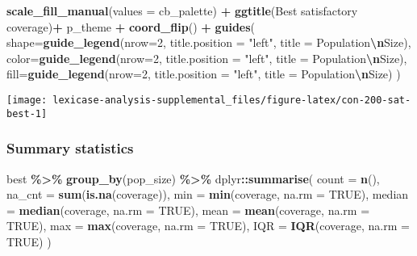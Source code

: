 \documentclass[
]{book}
\newenvironment{Shaded}{\begin{snugshade}}{\end{snugshade}}
\newcommand{\AttributeTok}[1]{\textcolor[rgb]{0.13,0.29,0.53}{#1}}
\newcommand{\ConstantTok}[1]{\textcolor[rgb]{0.56,0.35,0.01}{#1}}
\newcommand{\DecValTok}[1]{\textcolor[rgb]{0.00,0.00,0.81}{#1}}
\newcommand{\FunctionTok}[1]{\textcolor[rgb]{0.13,0.29,0.53}{\textbf{#1}}}
\newcommand{\NormalTok}[1]{#1}
\newcommand{\SpecialCharTok}[1]{\textcolor[rgb]{0.81,0.36,0.00}{\textbf{#1}}}
\newcommand{\StringTok}[1]{\textcolor[rgb]{0.31,0.60,0.02}{#1}}
\begin{document}
\begin{Shaded}
\begin{Highlighting}[]
  \FunctionTok{scale\_fill\_manual}\NormalTok{(}\AttributeTok{values =}\NormalTok{ cb\_palette) }\SpecialCharTok{+}
  \FunctionTok{ggtitle}\NormalTok{(}\StringTok{\textquotesingle{}Best satisfactory coverage\textquotesingle{}}\NormalTok{)}\SpecialCharTok{+}
\NormalTok{  p\_theme }\SpecialCharTok{+} \FunctionTok{coord\_flip}\NormalTok{() }\SpecialCharTok{+}
  \FunctionTok{guides}\NormalTok{(}
    \AttributeTok{shape=}\FunctionTok{guide\_legend}\NormalTok{(}\AttributeTok{nrow=}\DecValTok{2}\NormalTok{, }\AttributeTok{title.position =} \StringTok{"left"}\NormalTok{, }\AttributeTok{title =} \StringTok{\textquotesingle{}Population}\SpecialCharTok{\textbackslash{}n}\StringTok{Size\textquotesingle{}}\NormalTok{),}
    \AttributeTok{color=}\FunctionTok{guide\_legend}\NormalTok{(}\AttributeTok{nrow=}\DecValTok{2}\NormalTok{, }\AttributeTok{title.position =} \StringTok{"left"}\NormalTok{, }\AttributeTok{title =} \StringTok{\textquotesingle{}Population}\SpecialCharTok{\textbackslash{}n}\StringTok{Size\textquotesingle{}}\NormalTok{),}
    \AttributeTok{fill=}\FunctionTok{guide\_legend}\NormalTok{(}\AttributeTok{nrow=}\DecValTok{2}\NormalTok{, }\AttributeTok{title.position =} \StringTok{"left"}\NormalTok{, }\AttributeTok{title =} \StringTok{\textquotesingle{}Population}\SpecialCharTok{\textbackslash{}n}\StringTok{Size\textquotesingle{}}\NormalTok{)}
\NormalTok{  )}
\end{Highlighting}
\end{Shaded}

\texttt{[image: lexicase-analysis-supplemental\_files/figure-latex/con-200-sat-best-1]}

\hypertarget{summary-statistics-6}{%
\subsubsection{Summary statistics}\label{summary-statistics-6}}

\begin{Shaded}
\begin{Highlighting}[]
\NormalTok{best }\SpecialCharTok{\%\textgreater{}\%}
  \FunctionTok{group\_by}\NormalTok{(pop\_size) }\SpecialCharTok{\%\textgreater{}\%}
\NormalTok{  dplyr}\SpecialCharTok{::}\FunctionTok{summarise}\NormalTok{(}
    \AttributeTok{count =} \FunctionTok{n}\NormalTok{(),}
    \AttributeTok{na\_cnt =} \FunctionTok{sum}\NormalTok{(}\FunctionTok{is.na}\NormalTok{(coverage)),}
    \AttributeTok{min =} \FunctionTok{min}\NormalTok{(coverage, }\AttributeTok{na.rm =} \ConstantTok{TRUE}\NormalTok{),}
    \AttributeTok{median =} \FunctionTok{median}\NormalTok{(coverage, }\AttributeTok{na.rm =} \ConstantTok{TRUE}\NormalTok{),}
    \AttributeTok{mean =} \FunctionTok{mean}\NormalTok{(coverage, }\AttributeTok{na.rm =} \ConstantTok{TRUE}\NormalTok{),}
    \AttributeTok{max =} \FunctionTok{max}\NormalTok{(coverage, }\AttributeTok{na.rm =} \ConstantTok{TRUE}\NormalTok{),}
    \AttributeTok{IQR =} \FunctionTok{IQR}\NormalTok{(coverage, }\AttributeTok{na.rm =} \ConstantTok{TRUE}\NormalTok{)}
\NormalTok{  )}
\end{Highlighting}
\end{Shaded}
\end{document}
